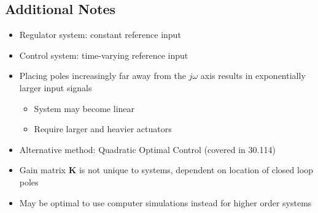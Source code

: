 \documentclass[a4paper]{article}
\begin{document}
\subsection{Additional Notes}
\begin{itemize}
    \item Regulator system: constant reference input
    \item Control system: time-varying reference input
    \item Placing poles increasingly far away from the $j\omega$ axis results in exponentially larger input signals
    \begin{itemize}[label=$\circ$]
        \item System may become linear
        \item Require larger and heavier actuators
    \end{itemize}
    \item Alternative method: Quadratic Optimal Control (covered in 30.114)
    \item Gain matrix $\mathbf{K}$ is not unique to systems, dependent on location of closed loop poles
    \item May be optimal to use computer simulations instead for higher order systems
\end{itemize}
\end{document}
